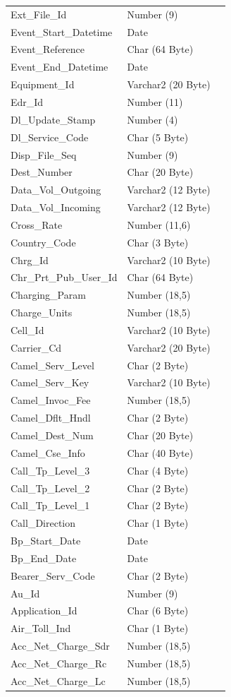 \documentclass[12pt,twoside]{article}
\begin{document}
\begin{longtable}{l|l|l}
Ext\_File\_Id & Number (9) & \\
Event\_Start\_Datetime & Date & \\
Event\_Reference & Char (64 Byte) & \\
Event\_End\_Datetime & Date & \\
Equipment\_Id & Varchar2 (20 Byte) & \\
Edr\_Id & Number (11) & \\
Dl\_Update\_Stamp & Number (4) & \\
Dl\_Service\_Code & Char (5 Byte) & \\
Disp\_File\_Seq & Number (9) & \\
Dest\_Number & Char (20 Byte) & \\
Data\_Vol\_Outgoing & Varchar2 (12 Byte) & \\
Data\_Vol\_Incoming & Varchar2 (12 Byte) & \\
Cross\_Rate & Number (11,6) & \\
Country\_Code & Char (3 Byte) & \\
Chrg\_Id & Varchar2 (10 Byte) & \\
Chr\_Prt\_Pub\_User\_Id & Char (64 Byte) & \\
Charging\_Param & Number (18,5) & \\
Charge\_Units & Number (18,5) & \\
Cell\_Id & Varchar2 (10 Byte) & \\
Carrier\_Cd & Varchar2 (20 Byte) & \\
Camel\_Serv\_Level & Char (2 Byte) & \\
Camel\_Serv\_Key & Varchar2 (10 Byte) & \\
Camel\_Invoc\_Fee & Number (18,5) & \\
Camel\_Dflt\_Hndl & Char (2 Byte) & \\
Camel\_Dest\_Num & Char (20 Byte) & \\
Camel\_Cse\_Info & Char (40 Byte) & \\
Call\_Tp\_Level\_3 & Char (4 Byte) & \\
Call\_Tp\_Level\_2 & Char (2 Byte) & \\
Call\_Tp\_Level\_1 & Char (2 Byte) & \\
Call\_Direction & Char (1 Byte) & \\
Bp\_Start\_Date & Date & \\
Bp\_End\_Date & Date & \\
Bearer\_Serv\_Code & Char (2 Byte) & \\
Au\_Id & Number (9) & \\
Application\_Id & Char (6 Byte) & \\
Air\_Toll\_Ind & Char (1 Byte) & \\
Acc\_Net\_Charge\_Sdr & Number (18,5) & \\
Acc\_Net\_Charge\_Rc & Number (18,5) & \\
Acc\_Net\_Charge\_Lc & Number (18,5) & \\
\hline
\end{longtable}
\normalsize
\end{document}
